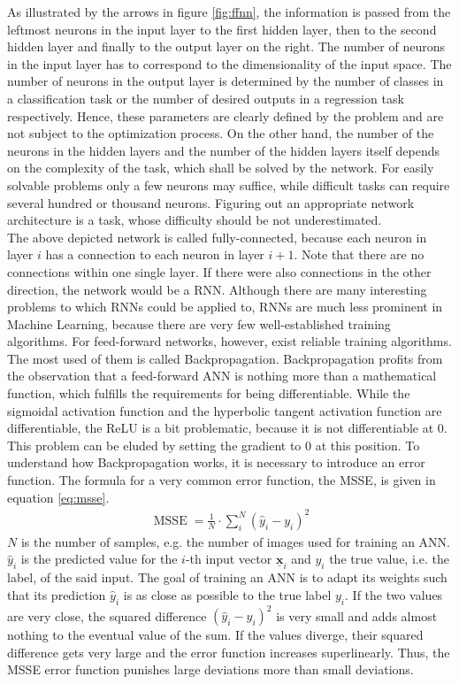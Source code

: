 \documentclass[11pt, a4paper]{article}
\newcommand\V[1]{\ensuremath{\underline{\mathbf{#1}}}}
\begin{document}
As illustrated by the arrows in figure \ref{fig:ffnn}, the information is passed from the leftmost neurons in the input layer to the first hidden layer, then to the second hidden layer and finally to the output layer on the right. The number of neurons in the input layer has to correspond to the dimensionality of the input space. The number of neurons in the output layer is determined by the number of classes in a classification task or the number of desired outputs in a regression task respectively. Hence, these parameters are clearly defined by the problem and are not subject to the optimization process. On the other hand, the number of the neurons in the hidden layers and the number of the hidden layers itself depends on the complexity of the task, which shall be solved by the network. For easily solvable problems only a few neurons may suffice, while difficult tasks can require several hundred or thousand neurons. Figuring out an appropriate network architecture is a task, whose difficulty should be not underestimated.\\
The above depicted network is called fully-connected, because each neuron in layer $i$ has a connection to each neuron in layer $i + 1$. Note that there are no connections within one single layer. If there were also connections in the other direction, the network would be a \ac{RNN}. Although there are many interesting problems to which \acp{RNN} could be applied to, \acp{RNN} are much less prominent in Machine Learning, because there are very few well-established training algorithms. For feed-forward networks, however, exist reliable training algorithms. The most used of them is called Backpropagation. Backpropagation profits from the observation that a feed-forward \ac{ANN} is nothing more than a mathematical function, which fulfills the requirements for being differentiable. While the sigmoidal activation function and the hyperbolic tangent activation function are differentiable, the \ac{ReLU} is a bit problematic, because it is not differentiable at $0$. This problem can be eluded by setting the gradient to $0$ at this position. To understand how Backpropagation works, it is necessary to introduce an error function. The formula for a very common error function, the \ac{MSSE}, is given in equation \eqref{eq:msse}.
\label{msse}
\begin{align}
\label{eq:msse}
\operatorname{MSSE} = \frac{1}{N} \cdot \sum_{i}^{N} \left(\hat{y}_i - y_i\right)^2
\end{align}
$N$ is the number of samples, e.g. the number of images used for training an \ac{ANN}. $\hat{y}_i$ is the predicted value for the $i$-th input vector $\V{x}_i$ and $y_i$ the true value, i.e. the label, of the said input. The goal of training an \ac{ANN} is to adapt its weights such that its prediction $\hat{y}_i$ is as close as possible to the true label $y_i$. If the two values are very close, the squared difference $(\hat{y}_i - y_i)^2$ is very small and adds almost nothing to the eventual value of the sum. If the values diverge, their squared difference gets very large and the error function increases superlinearly. Thus, the \ac{MSSE} error function punishes large deviations more than small deviations.\\
\end{document}
